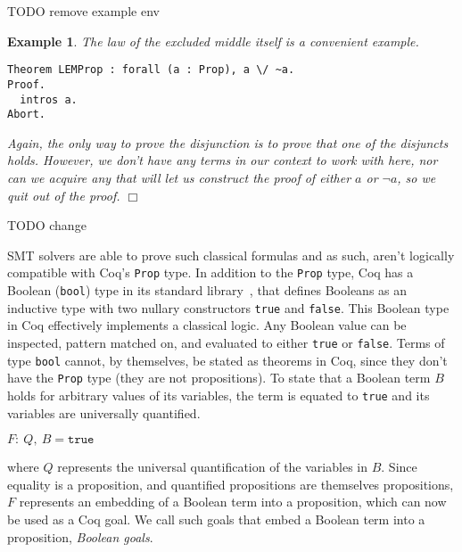 \documentclass[11pt]{article}
\newtheorem{example}{Example}[section]
\begin{document}
	TODO remove example env
	
	\begin{example}
		\em The law of the excluded middle
		itself is a convenient example.
	\begin{verbatim}
Theorem LEMProp : forall (a : Prop), a \/ ~a.
Proof.
  intros a. 
Abort.
	\end{verbatim}
		Again, the only way to prove the 
		disjunction is to prove that one 
		of the disjuncts holds. However, 
		we don't have any terms in our
		context to work 
		with here, nor can we acquire any
		that will let us construct the 
		proof of either $a$ or $\neg a$,
		so we quit out of the proof.
		\hfill$\Box$
	\end{example}
	TODO change
	
	SMT solvers are able to prove 
	such classical formulas and as
	such, aren't logically compatible
	with Coq's \texttt{Prop} type. 
	In addition to the \texttt{Prop} 
	type, Coq has a Boolean 
	(\texttt{bool}) type in its standard 
	library~\cite{CoqBool}, that defines 
	Booleans as an 
	inductive type with two nullary
	constructors \texttt{true} and
	\texttt{false}. This Boolean type 
	in Coq effectively implements a classical 
	logic. Any Boolean value can 
	be inspected, pattern matched on,
	and evaluated to either 
	\texttt{true} or \texttt{false}.
	Terms of type \texttt{bool} 
	cannot, by themselves, be 
	stated as theorems
	in Coq, since they don't have 
	the \texttt{Prop} type
	(they are not propositions). 
	To state that a Boolean term 
	$B$ holds for arbitrary values 
	of its variables, the term is 
	equated to \texttt{true}
	and its variables are 
	universally quantified.
	\begin{center}
		$F:\ Q,\ B = \texttt{true}$
	\end{center} 
	where $Q$ represents the 
	universal quantification of 
	the variables in $B$. Since 
	equality is a proposition, 
	and quantified propositions 
	are themselves propositions, 
	$F$ represents an embedding 
	of a Boolean term into a 
	proposition, which can now be
	used as a Coq goal. We 
	call such goals that 
	embed a Boolean term into a 
	proposition, \textit{Boolean
	goals}.
\end{document}
